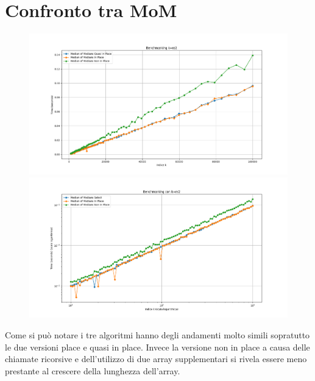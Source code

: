 \documentclass[a4paper]{article}
\begin{document}
\section{Confronto tra MoM}
\begin{figure}[h]
    \centering
    \includegraphics[width=.83\textwidth]{graphs/MoMs.png}
    \includegraphics[width=.83\textwidth]{graphs/MoMs_log.png}
\end{figure}
Come si può notare i tre algoritmi hanno degli andamenti molto simili sopratutto le due versioni place e quasi in place. Invece la versione non in place a causa delle chiamate ricorsive e dell'utilizzo di due array supplementari si rivela essere meno prestante al crescere della lunghezza dell'array.\\
\end{document}
